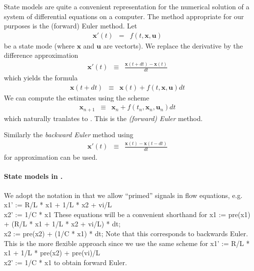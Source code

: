 State models are quite a convenient representation for the numerical solution
of a system of differential equations on a computer. The method appropriate
for our purposes is the (forward) Euler method. Let 
\begin{eqnarray*}
\mathbf{x}'(t) & = & f(t,\mathbf{x},\mathbf{u})
\end{eqnarray*}
be a state mode (where $\mathbf{x}$ and $\mathbf{u}$ are vectorts). We replace the derivative by the difference approximation 
\begin{eqnarray*}
\mathbf{x}'(t) & \equiv & \frac{\mathbf{x}(t + dt)-\mathbf{x}(t)}{dt}
\end{eqnarray*}
which yields the formula
\begin{eqnarray*}
\mathbf{x}(t + dt) & \equiv & \mathbf{x}(t) + f(t,\mathbf{x},\mathbf{u})dt
\end{eqnarray*}
We can compute the estimates using the scheme
\begin{eqnarray*}
\mathbf{x}_{n+1} & \equiv & \mathbf{x}_{n} + f(t_{n},\mathbf{x}_{n},\mathbf{u}_{n})dt
\end{eqnarray*}
which naturally tranlates to \se. This is the \emph{(forward) Euler} method.

Similarly the \emph{backward Euler} method using
\begin{eqnarray*}
\mathbf{x}'(t) & \equiv & \frac{\mathbf{x}(t)-\mathbf{x}(t - dt)}{dt}
\end{eqnarray*}
for approximation can be used.

\paragraph{State models in \se.} We adopt the notation in that we allow ``primed'' signals in flow equations, e.g.
\BEP
  x1' := R/L * x1 + 1/L * x2 + vi/L\\
  x2' := 1/C * x1
\EEP
These equations will be a convenient shorthand for
\BEP
  x1 := pre(x1) + (R/L * x1 + 1/L * x2 + vi/L) * dt;\\
  x2 := pre(x2) + (1/C * x1) * dt;
\EEP
Note that this corresponds to backwards Euler. This is the more flexible
approach since we use the same scheme for
\BEP
  x1' := R/L * x1 + 1/L * pre(x2) + pre(vi)/L\\
  x2' := 1/C * x1
\EEP
to obtain forward Euler.

